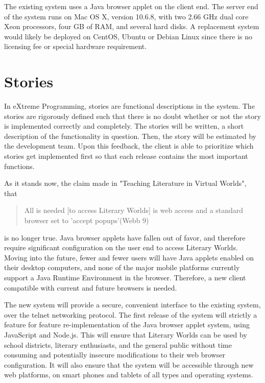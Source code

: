 \documentclass[12pt, letterpaper]{report}
\begin{document}
	\par
	The existing system uses a Java browser applet on the client end. The server end of the system runs on Mac OS X, version 10.6.8, with two 2.66 GHz dual core Xeon processors, four GB of RAM, and several hard disks. A replacement system would likely be deployed on CentOS, Ubuntu or Debian Linux since there is no licensing fee or special hardware requirement.
	
%
	\chapter{Stories}
	\par
	In eXtreme Programming, stories are functional descriptions in the system. The stories are rigorously defined such that there is no doubt whether or not the story is implemented correctly and completely. The stories will be written, a short description of the functionality in question. Then, the story will be estimated by the development team. Upon this feedback, the client is able to prioritize which stories get implemented first so that each release contains the most important functions.
	
	\par
	As it stands now, the claim made in "Teaching Literature in Virtual Worlds", that 
	
	\begin{quotation}
    All is needed [to access Literary Worlds] is web access and a standard browser set to 'accept popups'(Webb 9)
	\end{quotation}
	is no longer true. Java browser applets have fallen out of favor, and therefore require significant configuration on the user end to access Literary Worlds. Moving into the future, fewer and fewer users will have Java applets enabled on their desktop computers, and none of the major mobile platforms currently support a Java Runtime Environment in the browser. Therefore, a new client compatible with current and future browsers is needed.
	
	\par
	The new system will provide a secure, convenient interface to the existing system, over the telnet networking protocol. The first release of the system will strictly a feature for feature re-implementation of the Java browser applet system, using JavaScript and Node.js. This will ensure that Literary Worlds can be used by school districts, literary enthusiasts, and the general public without time consuming and potentially insecure modifications to their web browser configuration. It will also ensure that the system will be accessible through new web platforms, on smart phones and tablets of all types and operating systems.
	
\end{document}
